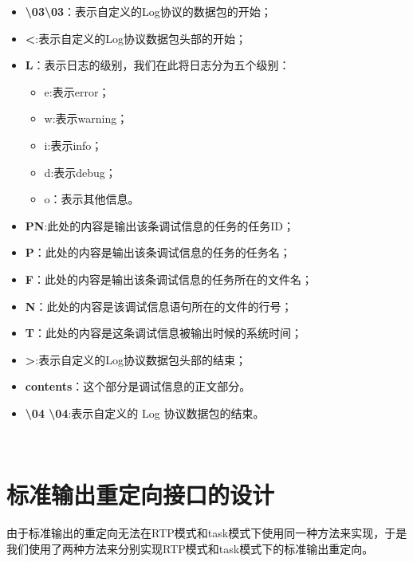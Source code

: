 \begin{itemize}
\item \textbf{\backslash 03\backslash 03}：表示自定义的Log协议的数据包的开始；

\item \textbf{<}:表示自定义的Log协议数据包头部的开始；

\item \textbf{L}：表示日志的级别，我们在此将日志分为五个级别：
	\begin{itemize}
	\item e:表示error；
	
	\item w:表示warning；
	
	\item i:表示info；
	
	\item d:表示debug；
	
	\item o：表示其他信息。
	\end{itemize}
	
\item \textbf{PN}:此处的内容是输出该条调试信息的任务的任务ID；

\item \textbf{P}：此处的内容是输出该条调试信息的任务的任务名；

\item \textbf{F}：此处的内容是输出该条调试信息的任务所在的文件名；

\item \textbf{N}：此处的内容是该调试信息语句所在的文件的行号；

\item \textbf{T}：此处的内容是这条调试信息被输出时候的系统时间；

\item \textbf{>}:表示自定义的Log协议数据包头部的结束；

\item \textbf{contents}：这个部分是调试信息的正文部分。

\item \textbf{\backslash 04 \backslash 04}:表示自定义的 Log 协议数据包的结束。

\end{itemize}\\


\section{标准输出重定向接口的设计}
	由于标准输出的重定向无法在RTP模式和task模式下使用同一种方法来实现，于是我们使用了两种方法来分别实现RTP模式和task模式下的标准输出重定向。
